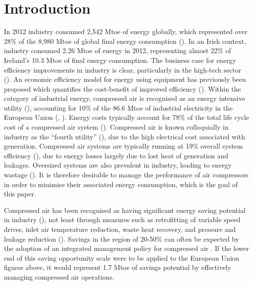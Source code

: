 \section{Introduction}
\label{intro}

In 2012 industry consumed 2,542 Mtoe of energy globally, which represented  over 28\% of the 8,980 Mtoe of global final energy consumption (\cite{IEA2012}). In an Irish context, industry consumed 2.26 Mtoe of energy in 2012, representing almost 22\% of Ireland’s 10.3 Mtoe of final energy consumption. The business case for energy efficiency improvements in industry is clear, particularly in the high-tech sector (\cite{Mills2007}). An economic efficiency model for energy using equipment has previously been proposed which quantifies the cost-benefit of improved efficiency (\cite{Blum2014}). Within the category of industrial energy, compressed air is recognised as an energy intensive utility (\cite{Wang2013a}), accounting for 10\% of the 86.6 Mtoe of industrial electricity in the European Union (\cite{Saidur2010}, \cite{Eurostat2014}). Energy costs typically account for 78\% of the total life cycle cost of a compressed air system (\cite{radgen2006efficiency}). Compressed air is known colloquially in industry as the “fourth utility” (\cite{Fairest2014}), due to the high electrical cost associated with generation. Compressed air systems are typically running at 19\% overall system efficiency (\cite{Saidur2010}), due to energy losses largely due to lost heat of generation and leakages. Oversized systems are also prevalent in industry, leading to energy wastage (\cite{Laurijssen2013}). It is therefore desirable to manage the performance of air compressors in order to minimise their associated energy consumption, which is the goal of this paper.

\bigskip

Compressed air has been recognised as having significant energy saving potential in industry (\cite{Wang2014}), not least through measures such as retrofitting of variable speed drives, inlet air temperature reduction, waste heat recovery, and pressure and leakage reduction (\cite{Wang2008}). Savings in the region of 20-50\% can often be expected by the adoption of an integrated management policy for compressed air \cite{SEAI2007a}. If the lower end of this saving opportunity scale were to be applied to the European Union figures above, it would represent 1.7 Mtoe of savings potential by effectively managing compressed air operations. 

